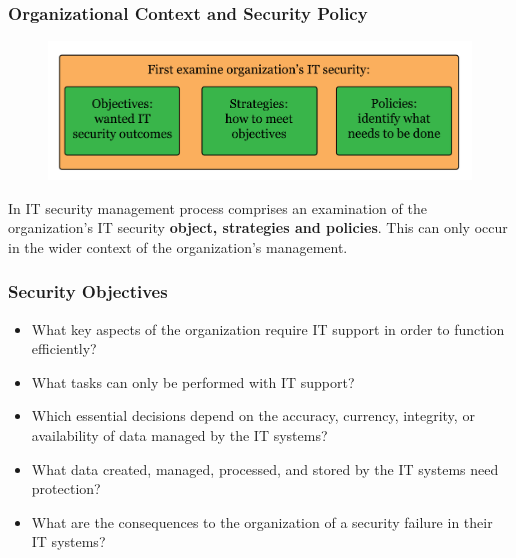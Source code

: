 \documentclass[xcolor ={table,usenames,dvipsnames}]{beamer}
\theoremstyle{definition}
\begin{document}

	\begin{frame}
		\frametitle{Organizational Context and Security Policy}
		\begin{figure}[h!]
			\centering
			\includegraphics[scale=0.20]{img/img_04.PNG}
			\label{Interfacce di un CS}
		\end{figure}
		In IT security management process comprises an examination of the organization's IT security \textbf{object, strategies and policies}. This can only occur in the wider context of the organization's management.
	
	\end{frame}

	\begin{frame}
		\frametitle{Security Objectives}
		\begin{itemize}
			\item What key aspects of the organization require IT support in order to function efficiently?
			\item What tasks can only be performed with IT support?
			\item Which essential decisions depend on the accuracy, currency, integrity, or availability of data managed by the IT systems?
			\item What data created, managed, processed, and stored by the IT systems need
			protection?
			\item What are the consequences to the organization of a security failure in their IT systems?
		\end{itemize}
	\end{frame}
\end{document}

